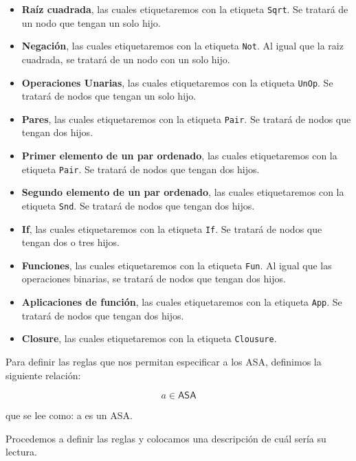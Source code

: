 \documentclass[a4paper,12pt]{article}
\begin{document}
\begin{tcolorbox}[title=Correción:ASA de  LAMBDAE    MÓDULO A3, breakable]
\begin{itemize}
    \item \textbf{Raíz cuadrada}, las cuales etiquetaremos con la etiqueta \texttt{Sqrt}. 
    Se tratará de un nodo que tengan un solo hijo.

    \item \textbf{Negación}, las cuales etiquetaremos con la etiqueta \texttt{Not}. 
    Al igual que la raiz cuadrada, se tratará de un nodo con un solo hijo.

    \item \textbf{Operaciones Unarias}, las cuales etiquetaremos con la etiqueta \texttt{UnOp}. 
    Se tratará de nodos que tengan un solo hijo.

    \item \textbf{Pares}, las cuales etiquetaremos con la etiqueta \texttt{Pair}. 
    Se tratará de nodos que tengan dos hijos.

    \item \textbf{Primer elemento de un par ordenado}, las cuales etiquetaremos con la etiqueta \texttt{Pair}. 
    Se tratará de nodos que tengan dos hijos.

    \item \textbf{Segundo elemento de un par ordenado}, las cuales etiquetaremos con la etiqueta \texttt{Snd}. 
    Se tratará de nodos que tengan dos hijos.

    \item \textbf{If}, las cuales etiquetaremos con la etiqueta \texttt{If}. 
    Se tratará de nodos que tengan dos o tres hijos.

    \item \textbf{Funciones}, las cuales etiquetaremos con la etiqueta \texttt{Fun}. 
    Al igual que las operaciones binarias, se tratará de nodos que tengan dos hijos.

    \item \textbf{Aplicaciones de función}, las cuales etiquetaremos con la etiqueta \texttt{App}. 
    Se tratará de nodos que tengan dos hijos.

    \item \textbf{Closure}, las cuales etiquetaremos con la etiqueta \texttt{Clousure}. 
\end{itemize}

Para definir las reglas que nos permitan especificar a los ASA, definimos la siguiente relación:

\[
a  \in \mathsf{ASA}
\]

que se lee como: a es un ASA. 

Procedemos a definir las reglas y colocamos una descripción 
de cuál sería su lectura.\cite{LambdaSpace05,UNAMTesis}


\end{tcolorbox}
\end{document}
